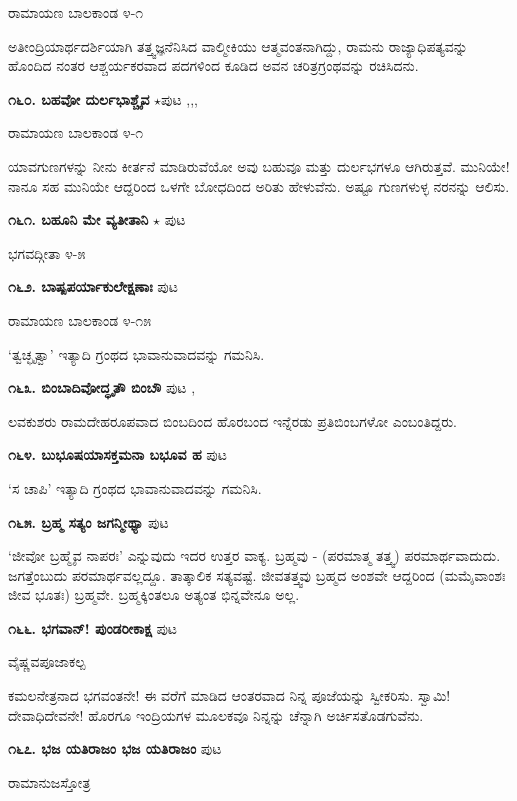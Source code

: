 {\hfill ರಾಮಾಯಣ ಬಾಲಕಾಂಡ ೪-೧

ಅತೀಂದ್ರಿಯಾರ್ಥದರ್ಶಿಯಾಗಿ ತತ್ತ್ವಜ್ಞನೆನಿಸಿದ ವಾಲ್ಮೀಕಿಯು ಆತ್ಮವಂತನಾಗಿದ್ದು, ರಾಮನು ರಾಜ್ಯಾಧಿಪತ್ಯವನ್ನು ಹೊಂದಿದ ನಂತರ ಆಶ್ಚರ್ಯಕರವಾದ ಪದಗಳಿಂದ ಕೂಡಿದ ಅವನ ಚರಿತ್ರಗ್ರಂಥವನ್ನು ರಚಿಸಿದನು.

\medskip
\noindent\textbf{೧೬೦. ಬಹವೋ ದುರ್ಲಭಾಶ್ಚೈವ} $\star$\hfill ಪುಟ \pageref{163a},\pageref{194a},\pageref{219a},\pageref{247c}

\hfill ರಾಮಾಯಣ ಬಾಲಕಾಂಡ ೪-೧

ಯಾವಗುಣಗಳನ್ನು ನೀನು ಕೀರ್ತನೆ ಮಾಡಿರುವೆಯೋ ಅವು ಬಹುವೂ ಮತ್ತು ದುರ್ಲಭಗಳೂ ಆಗಿರುತ್ತವೆ. ಮುನಿಯೇ! ನಾನೂ ಸಹ ಮುನಿಯೇ ಆದ್ದರಿಂದ ಒಳಗೇ ಬೋಧದಿಂದ ಅರಿತು ಹೇಳುವೆನು. ಅಷ್ಟೂ ಗುಣಗಳುಳ್ಳ ನರನನ್ನು ಆಲಿಸು.

\medskip
\noindent\textbf{೧೬೧. ಬಹೂನಿ ಮೇ ವ್ಯತೀತಾನಿ} $\star$ \hfill ಪುಟ \pageref{91a}

\hfill ಭಗವದ್ಗೀತಾ ೪-೫

\medskip
\noindent\textbf{೧೬೨. ಬಾಷ್ಪಪರ್ಯಾಕುಲೇಕ್ಷಣಾಃ} \hfill ಪುಟ \pageref{211b}

\hfill ರಾಮಾಯಣ ಬಾಲಕಾಂಡ ೪-೧೫

`ತ್ವಚ್ಛೃತ್ವಾ' ಇತ್ಯಾದಿ ಗ್ರಂಥದ ಭಾವಾನುವಾದವನ್ನು ಗಮನಿಸಿ.

\medskip
\noindent\textbf{೧೬೩. ಬಿಂಬಾದಿವೋದ್ಧೃತೌ ಬಿಂಬೌ} \hfill ಪುಟ \pageref{167b},\pageref{228a}

ಲವಕುಶರು ರಾಮದೇಹರೂಪವಾದ ಬಿಂಬದಿಂದ ಹೊರಬಂದ ಇನ್ನೆರಡು ಪ್ರತಿಬಿಂಬಗಳೋ ಎಂಬಂತಿದ್ದರು.

\medskip
\noindent\textbf{೧೬೪. ಬುಭೂಷಯಾಸಕ್ತಮನಾ ಬಭೂವ ಹ} \hfill ಪುಟ \pageref{211c}

`ಸ ಚಾಪಿ' ಇತ್ಯಾದಿ ಗ್ರಂಥದ ಭಾವಾನುವಾದವನ್ನು ಗಮನಿಸಿ.

\medskip
\noindent\textbf{೧೬೫. ಬ್ರಹ್ಮ ಸತ್ಯಂ ಜಗನ್ಮೀಥ್ಯಾ} \hfill ಪುಟ \pageref{54a}

\hfill `ಜೀವೋ ಬ್ರಹ್ಮೈವ ನಾಪರಃ' ಎನ್ನುವುದು ಇದರ ಉತ್ತರ ವಾಕ್ಯ. ಬ್ರಹ್ಮವು - (ಪರಮಾತ್ಮ ತತ್ತ್ವ) ಪರಮಾರ್ಥವಾದುದು. ಜಗತ್ತೆಂಬುದು ಪರಮಾರ್ಥವಲ್ಲದ್ದೂ. ತಾತ್ಕಾಲಿಕ ಸತ್ಯವಷ್ಟೆ. ಜೀವತತ್ತ್ವವು ಬ್ರಹ್ಮದ ಅಂಶವೇ ಆದ್ದರಿಂದ (ಮಮೈವಾಂಶಃ ಜೀವ ಭೂತಃ) ಬ್ರಹ್ಮವೇ. ಬ್ರಹ್ಮಕ್ಕಿಂತಲೂ ಅತ್ಯಂತ ಭಿನ್ನವೇನೂ ಅಲ್ಲ.

\medskip
\noindent\textbf{೧೬೬. ಭಗವಾನ್! ಪುಂಡರೀಕಾಕ್ಷ} \hfill ಪುಟ \pageref{115a}

\hfill ವೈಷ್ಣವಪೂಜಾಕಲ್ಪ

ಕಮಲನೇತ್ರನಾದ ಭಗವಂತನೇ! ಈ ವರೆಗೆ ಮಾಡಿದ ಆಂತರವಾದ ನಿನ್ನ ಪೂಜೆಯನ್ನು ಸ್ವೀಕರಿಸು. ಸ್ವಾಮಿ! ದೇವಾಧಿದೇವನೇ! ಹೊರಗೂ ಇಂದ್ರಿಯಗಳ ಮೂಲಕವೂ ನಿನ್ನನ್ನು ಚೆನ್ನಾಗಿ ಅರ್ಚಿಸತೊಡಗುವೆನು.

\medskip
\noindent\textbf{೧೬೭. ಭಜ ಯತಿರಾಜಂ ಭಜ ಯತಿರಾಜಂ} \hfill ಪುಟ \pageref{46}

\hfill ರಾಮಾನುಜಸ್ತೋತ್ರ

}
